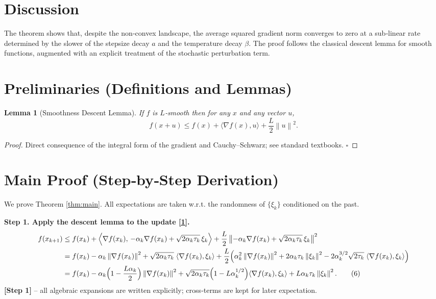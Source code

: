 \documentclass{article}
\newtheorem{lemma}{Lemma}
\newcommand{\norm}[1]{\left\|#1\right\|}
\begin{document}
\section*{Discussion}
The theorem shows that, despite the non‑convex landscape, the average squared gradient norm converges to zero at a sub‑linear rate determined by the slower of the stepsize decay $a$ and the temperature decay $\beta$. The proof follows the classical descent lemma for smooth functions, augmented with an explicit treatment of the stochastic perturbation term.

\section*{Preliminaries (Definitions and Lemmas)}
\begin{lemma}[Smoothness Descent Lemma]\label{lem:descent}
If $f$ is $L$‑smooth then for any $x$ and any vector $u$,
\[
f(x+u)\le f(x)+\langle\nabla f(x),u\rangle+\frac{L}{2}\norm{u}^{2}.
\tag{5}
\]
\end{lemma}
\begin{proof}
Direct consequence of the integral form of the gradient and Cauchy–Schwarz; see standard textbooks. \hfill $\square$
\end{proof}

\section*{Main Proof (Step‑by‑Step Derivation)}
We prove Theorem \ref{thm:main}. All expectations are taken w.r.t. the randomness of $\{\xi_{k}\}$ conditioned on the past.

\medskip
\noindent\textbf{Step 1. Apply the descent lemma to the update \eqref{1}.}
\begin{align}
f(x_{k+1})
&\le f(x_{k})+\Big\langle \nabla f(x_{k}),\,
      -\alpha_{k}\nabla f(x_{k})+\sqrt{2\alpha_{k}\tau_{k}}\,\xi_{k}\Big\rangle
      +\frac{L}{2}\norm{-\alpha_{k}\nabla f(x_{k})+\sqrt{2\alpha_{k}\tau_{k}}\,\xi_{k}}^{2}
      \nonumber\\
&= f(x_{k}) -\alpha_{k}\norm{\nabla f(x_{k})}^{2}
   +\sqrt{2\alpha_{k}\tau_{k}}\;\langle \nabla f(x_{k}),\xi_{k}\rangle
   +\frac{L}{2}\Big(\alpha_{k}^{2}\norm{\nabla f(x_{k})}^{2}
   +2\alpha_{k}\tau_{k}\norm{\xi_{k}}^{2}
   -2\alpha_{k}^{3/2}\sqrt{2\tau_{k}}\;\langle \nabla f(x_{k}),\xi_{k}\rangle\Big)
   \nonumber\\
&= f(x_{k}) -\alpha_{k}\Bigl(1-\frac{L\alpha_{k}}{2}\Bigr)\norm{\nabla f(x_{k})}^{2}
   +\sqrt{2\alpha_{k}\tau_{k}}\Bigl(1-L\alpha_{k}^{1/2}\Bigr)\langle \nabla f(x_{k}),\xi_{k}\rangle
   +L\alpha_{k}\tau_{k}\norm{\xi_{k}}^{2}.
   \tag{6}\label{eq:step1}
\end{align}
\noindent\textbf{[Step 1]} – all algebraic expansions are written explicitly; cross‑terms are kept for later expectation.
\end{document}
